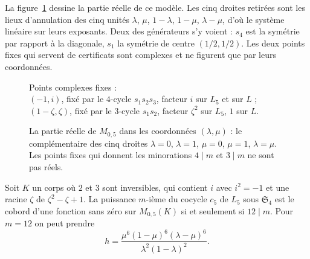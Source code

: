 La figure~\ref{fig:146-m05} dessine la partie réelle de ce modèle. Les cinq droites retirées sont les lieux d'annulation des cinq unités $\lambda$, $\mu$, $1 - \lambda$, $1 - \mu$, $\lambda - \mu$, d'où le système linéaire sur leurs exposants. Deux des générateurs s'y voient : $s_4$ est la symétrie par rapport à la diagonale, $s_1$ la symétrie de centre $(1/2, 1/2)$. Les deux points fixes qui servent de certificats sont complexes et ne figurent que par leurs coordonnées.

\begin{figure}[htbp]
\centering
{}
\qquad
\begin{minipage}[b]{0.36\textwidth}\small\raggedright
Points complexes fixes :\\[2pt]
$(-1, i)$, fixé par le $4$-cycle $s_1 s_2 s_3$, facteur $i$ sur $L_5$ et sur $L$ ;\\[2pt]
$(1 - \zeta, \zeta)$, fixé par le $3$-cycle $s_1 s_2$, facteur $\zeta^2$ sur $L_5$, $1$ sur $L$.\\[6pt]
\end{minipage}
\caption{La partie réelle de $M_{0,5}$ dans les coordonnées $(\lambda, \mu)$ : le complémentaire des cinq droites $\lambda = 0$, $\lambda = 1$, $\mu = 0$, $\mu = 1$, $\lambda = \mu$. Les points fixes qui donnent les minorations $4 \mid m$ et $3 \mid m$ ne sont pas réels.}
\label{fig:146-m05}
\end{figure}


\begin{encadre}
\begin{theoreme}[conjecture de la page 70, colonne $n = 5$, pour $L_i$ (\q{$12\,?$}), démontrée par l'édition\piste{146-equivariant-trivialising-exponents}]\label{thm:146-douze}
Soit $K$ un corps où $2$ et $3$ sont inversibles, qui contient $i$ avec $i^2 = -1$ et une racine $\zeta$ de $\zeta^2 - \zeta + 1$. La puissance $m$-ième du cocycle $c_5$ de $L_5$ sous $\mathfrak S_4$ est le cobord d'une fonction sans zéro sur $M_{0,5}(K)$ si et seulement si $12 \mid m$. Pour $m = 12$ on peut prendre
\[
h = \frac{\mu^6 (1 - \mu)^6 (\lambda - \mu)^6}{\lambda^2 (1 - \lambda)^2}.
\]
\end{theoreme}
\end{encadre}

